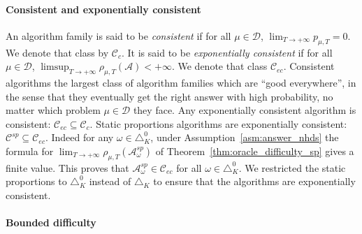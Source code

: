 \documentclass{article}
\begin{document}
\paragraph{Consistent and exponentially consistent}
\label{par:consistent}

An algorithm family is said to be \emph{consistent} \cite{kaufmann2016complexity} if for all $\mu \in \mathcal D$, $\lim_{T\to + \infty} p_{\mu, T} = 0$. We denote that class by $\mathcal C_c$.
It is said to be \emph{exponentially consistent} \cite{barrier2022best} if for all $\mu \in \mathcal D$, $\limsup_{T \to +\infty} \rho_{\mu, T}(\mathcal A) < +\infty$. We denote that class $\mathcal C_{ec}$.
Consistent algorithms the largest class of algorithm families which are ``good everywhere'', in the sense that they eventually get the right answer with high probability, no matter which problem $\mu \in \mathcal D$ they face.
Any exponentially consistent algorithm is consistent: $\mathcal C_{ec} \subseteq \mathcal C_c$.
Static proportions algorithms are exponentially consistent: $\mathcal C^{sp} \subseteq \mathcal C_{ec}$. Indeed for any $\omega \in \triangle_K^0$, under Assumption~\ref{asm:answer_nhds} the formula for $\lim_{T \to + \infty} \rho_{\mu, T}(\mathcal A_\omega^{sp})$ of Theorem~\ref{thm:oracle_difficulty_sp} gives a finite value. This proves that $\mathcal A_\omega^{sp} \in \mathcal C_{ec}$ for all $\omega \in \triangle_K^0$.
We restricted the static proportions to $\triangle_K^0$ instead of $\triangle_K$ to ensure that the algorithms are exponentially consistent.

\paragraph{Bounded difficulty}
\label{par:bounded_difficulty}
\end{document}
